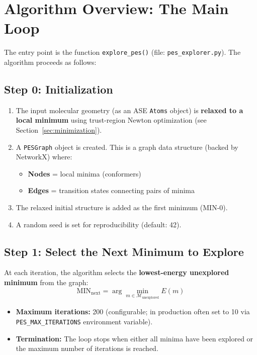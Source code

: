 \documentclass[11pt,a4paper]{article}
\begin{document}
\section{Algorithm Overview: The Main Loop}
\label{sec:main-loop}

The entry point is the function \texttt{explore\_pes()} (file: \texttt{pes\_explorer.py}). The algorithm proceeds as follows:

\subsection{Step 0: Initialization}

\begin{enumerate}
    \item The input molecular geometry (as an ASE \texttt{Atoms} object) is \textbf{relaxed to a local minimum} using trust-region Newton optimization (see Section~\ref{sec:minimization}).
    \item A \texttt{PESGraph} object is created. This is a graph data structure (backed by NetworkX) where:
    \begin{itemize}
        \item \textbf{Nodes} = local minima (conformers)
        \item \textbf{Edges} = transition states connecting pairs of minima
    \end{itemize}
    \item The relaxed initial structure is added as the first minimum (MIN-0).
    \item A random seed is set for reproducibility (default: 42).
\end{enumerate}

\subsection{Step 1: Select the Next Minimum to Explore}

At each iteration, the algorithm selects the \textbf{lowest-energy unexplored minimum} from the graph:
\begin{equation}
    \text{MIN}_\text{next} = \arg\min_{m \in \mathcal{M}_\text{unexplored}} E(m)
\end{equation}

\begin{threshbox}
\begin{itemize}
    \item \textbf{Maximum iterations:} 200 (configurable; in production often set to 10 via \texttt{PES\_MAX\_ITERATIONS} environment variable).
    \item \textbf{Termination:} The loop stops when either all minima have been explored or the maximum number of iterations is reached.
\end{itemize}
\end{threshbox}
\end{document}
